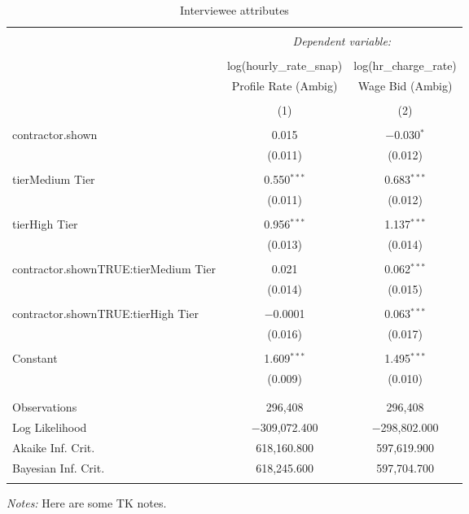 
\begin{table}[!htbp] \centering 
  \caption{Interviewee attributes} 
  \label{tab:interviewee_attributes} 
\begin{tabular}{@{\extracolsep{5pt}}lcc} 
\\[-1.8ex]\hline 
\hline \\[-1.8ex] 
 & \multicolumn{2}{c}{\textit{Dependent variable:}} \\ 
\cline{2-3} 
\\[-1.8ex] & log(hourly\_rate\_snap) & log(hr\_charge\_rate) \\ 
 & Profile Rate (Ambig) & Wage Bid (Ambig) \\ 
\\[-1.8ex] & (1) & (2)\\ 
\hline \\[-1.8ex] 
 contractor.shown & 0.015 & $-$0.030$^{*}$ \\ 
  & (0.011) & (0.012) \\ 
  & & \\ 
 tierMedium Tier & 0.550$^{***}$ & 0.683$^{***}$ \\ 
  & (0.011) & (0.012) \\ 
  & & \\ 
 tierHigh Tier & 0.956$^{***}$ & 1.137$^{***}$ \\ 
  & (0.013) & (0.014) \\ 
  & & \\ 
 contractor.shownTRUE:tierMedium Tier & 0.021 & 0.062$^{***}$ \\ 
  & (0.014) & (0.015) \\ 
  & & \\ 
 contractor.shownTRUE:tierHigh Tier & $-$0.0001 & 0.063$^{***}$ \\ 
  & (0.016) & (0.017) \\ 
  & & \\ 
 Constant & 1.609$^{***}$ & 1.495$^{***}$ \\ 
  & (0.009) & (0.010) \\ 
  & & \\ 
\hline \\[-1.8ex] 
Observations & 296,408 & 296,408 \\ 
Log Likelihood & $-$309,072.400 & $-$298,802.000 \\ 
Akaike Inf. Crit. & 618,160.800 & 597,619.900 \\ 
Bayesian Inf. Crit. & 618,245.600 & 597,704.700 \\ 
\hline 
\hline \\[-1.8ex] 
\end{tabular}
\emph{Notes:} Here are some TK notes.
\end{table}
